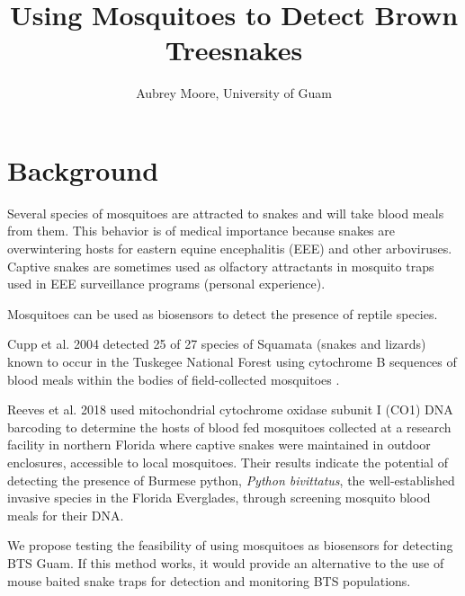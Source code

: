 \documentclass[12pt,letterpaper,english,bibliography=totocnumbered,abstract=on]{scrartcl}
\begin{document}
\titlehead{Research Idea}
\title{Using Mosquitoes to Detect Brown Treesnakes}
\author{Aubrey Moore, University of Guam}
\maketitle



\tableofcontents{}

\newpage
\listoftodos

\newpage


\section{Background} 

Several species of mosquitoes are attracted to snakes and will take blood meals from them. This behavior is of medical importance because snakes are overwintering hosts for eastern equine encephalitis (EEE) and other arboviruses. Captive snakes are sometimes used as olfactory attractants in mosquito traps used in EEE surveillance programs (personal experience).

Mosquitoes can be used as biosensors to detect the presence of reptile species. 

Cupp et al. 2004 detected 25 of 27 species of Squamata (snakes and lizards) known to occur in the Tuskegee National Forest using cytochrome B sequences of blood meals within the bodies of field-collected mosquitoes \cite{cuppIDENTIFICATIONREPTILIANAMPHIBIAN2004}. 

Reeves et al. 2018 \cite{reevesInteractionsInvasiveBurmese2018} used mitochondrial cytochrome oxidase subunit I (CO1) DNA barcoding to determine the hosts of blood fed mosquitoes collected at a research facility in northern Florida where captive snakes were maintained in outdoor enclosures, accessible to local mosquitoes.  Their results indicate the potential of detecting the presence of Burmese python, \textit{Python bivittatus}, the well-established invasive species in the Florida Everglades, through screening mosquito blood meals for their DNA.

We propose testing the feasibility of using mosquitoes as biosensors for detecting BTS Guam. If this method works, it would provide an alternative to the use of mouse baited snake traps for detection and monitoring BTS populations.
\end{document}
